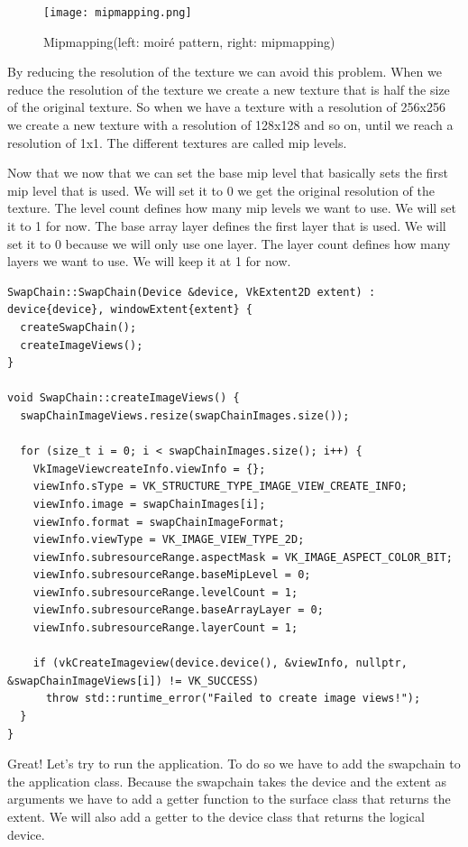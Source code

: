 \documentclass[12pt]{report} \usepackage{preamble}
\begin{document}
\begin{figure}[htbp]
	\centering
	\texttt{[image: mipmapping.png]}
	\caption{Mipmapping(left: moiré pattern, right: mipmapping)} \cite{fig:mipmapping}
\end{figure}

By reducing the resolution of the texture we can avoid this problem.
When we reduce the resolution of the texture we create a new texture that is half the size of the original texture.
So when we have a texture with a resolution of 256x256 we create a new texture with a resolution of 128x128 and so on,
until we reach a resolution of 1x1. The different textures are called mip levels.

Now that we now that we can set the base mip level that basically sets the first mip level that is used. We will set it to 0
we get the original resolution of the texture. The level count defines how many mip levels we want to use. We will set it to 1
for now. The base array layer defines the first layer that is used. We will set it to 0 because we will only use one layer.
The layer count defines how many layers we want to use. We will keep it at 1 for now.

\begin{lstlisting}[Language=C++]
SwapChain::SwapChain(Device &device, VkExtent2D extent) : device{device}, windowExtent{extent} {
  createSwapChain();
  createImageViews();
}

void SwapChain::createImageViews() {
  swapChainImageViews.resize(swapChainImages.size());

  for (size_t i = 0; i < swapChainImages.size(); i++) {
    VkImageViewcreateInfo.viewInfo = {};
    viewInfo.sType = VK_STRUCTURE_TYPE_IMAGE_VIEW_CREATE_INFO;
    viewInfo.image = swapChainImages[i];
    viewInfo.format = swapChainImageFormat;
    viewInfo.viewType = VK_IMAGE_VIEW_TYPE_2D;
    viewInfo.subresourceRange.aspectMask = VK_IMAGE_ASPECT_COLOR_BIT;
    viewInfo.subresourceRange.baseMipLevel = 0;
    viewInfo.subresourceRange.levelCount = 1;
    viewInfo.subresourceRange.baseArrayLayer = 0;
    viewInfo.subresourceRange.layerCount = 1;

    if (vkCreateImageview(device.device(), &viewInfo, nullptr, &swapChainImageViews[i]) != VK_SUCCESS)
      throw std::runtime_error("Failed to create image views!");
  }
}
\end{lstlisting}

Great! Let's try to run the application. To do so we have to add the swapchain to the application class.
Because the swapchain takes the device and the extent as arguments we have to add a getter function to the
surface class that returns the extent. We will also add a getter to the device class that returns the
logical device.
\end{document}
